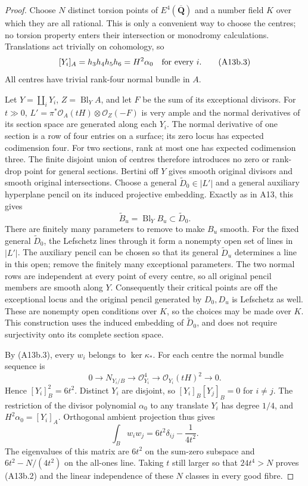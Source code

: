 \documentclass[11pt]{article}
\theoremstyle{remark}\newtheorem{remark}[theorem]{Remark}
\begin{document}
\begin{proof}
Choose $N$ distinct torsion points of $E^4(\overline{\mathbf Q})$
and a number field $K$ over which they are all rational. This
is only a convenient way to choose the centres; no torsion
property enters their intersection or monodromy calculations.
Translations act trivially on cohomology, so
\[
       [Y_i]_A=h_3h_4h_5h_6=H^2\alpha_0
                 \quad\hbox{for every }i.
 \tag{A13b.3}
\]
All centres have trivial rank-four normal bundle in $A$.

Let $Y=\coprod_iY_i$, $Z=\operatorname{Bl}_Y A$, and let $F$
be the sum of its exceptional divisors. For $t\gg0$,
$L'=\pi^*\mathcal O_A(tH)\otimes\mathcal O_Z(-F)$ is very
ample and the normal derivatives of its section space are
generated along each $Y_i$. The normal derivative of one
section is a row of four entries on a surface; its zero
locus has expected codimension four. For two sections,
rank at most one has expected codimension three. The finite
disjoint union of centres therefore introduces no zero or
rank-drop point for general sections. Bertini off $Y$ gives
smooth original divisors and smooth original intersections.
Choose a general $\widetilde D_0\in|L'|$ and a general
auxiliary hyperplane pencil on its induced projective embedding.
Exactly as in A13, this gives
\[
       \widetilde B_u=\operatorname{Bl}_Y B_u
                       \subset\widetilde D_0.
 \tag{A13b.4}
\]
There are finitely many parameters to remove to make $B_u$
smooth. For the fixed general $\widetilde D_0$, the Lefschetz
lines through it form a nonempty open set of lines in $|L'|$.
The auxiliary pencil can be chosen so that its general
$\widetilde D_u$ determines a line in this open; remove the
finitely many exceptional parameters. The two normal rows
are independent at every point of every centre, so all
original pencil members are smooth along $Y$. Consequently
their critical points are off the exceptional locus and the
original pencil generated by $D_0,D_u$ is Lefschetz as well.
These are nonempty open conditions over $K$, so the choices
may be made over $K$. This construction uses the induced
embedding of $\widetilde D_0$, and does not require surjectivity
onto its complete section space.

By (A13b.3), every $w_i$ belongs to $\ker\kappa_*$. For each
centre the normal bundle sequence is
\[
 0\longrightarrow N_{Y_i/B}\longrightarrow\mathcal O_{Y_i}^4
       \longrightarrow\mathcal O_{Y_i}(tH)^2\longrightarrow0.
\]
Hence $[Y_i]_B^2=6t^2$. Distinct $Y_i$ are disjoint, so
$[Y_i]_B[Y_j]_B=0$ for $i\ne j$. The restriction of the
divisor polynomial $\alpha_0$ to any translate $Y_i$ has
degree $1/4$, and $H^2\alpha_0=[Y_i]_A$. Orthogonal ambient
projection thus gives
\[
           \int_Bw_iw_j=6t^2\delta_{ij}-\frac1{4t^2}.
\]
The eigenvalues of this matrix are $6t^2$ on the sum-zero
subspace and $6t^2-N/(4t^2)$ on the all-ones line. Taking
$t$ still larger so that $24t^4>N$ proves (A13b.2) and the
linear independence of these $N$ classes in every good fibre.


\end{proof}
\end{document}
